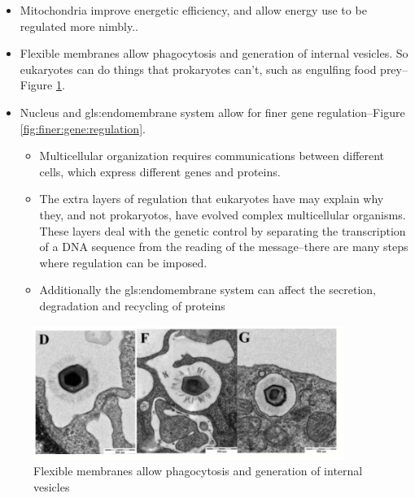 \documentclass[]{article}
\begin{document}
\begin{itemize}
	\item Mitochondria improve energetic efficiency, and allow energy use to be regulated more nimbly.\cite{lane2010energetics}.
	
	\item Flexible membranes allow phagocytosis and generation of internal vesicles. So eukaryotes can do things that prokaryotes can't, such as engulfing food prey--Figure \ref{fig:engulf}.
	
	\item Nucleus and \gls{gls:endomembrane} system allow for finer gene
	regulation--Figure \ref{fig:finer:gene:regulation}\cite{paez2016endocytosis}. 
	\begin{itemize}
		\item Multicellular organization requires communications between different cells, which express different genes and proteins.
		\item The extra layers of regulation that eukaryotes have may explain why they, and not prokaryotos, have evolved complex multicellular organisms. These layers deal with the genetic control by separating the transcription of a DNA sequence from the reading of the message--there are many steps where regulation can be imposed. 
		\item Additionally the \gls{gls:endomembrane} system can affect the secretion, degradation and recycling of proteins
	\end{itemize}
\end{itemize}

\begin{figure}[H]
	\caption{Flexible membranes allow phagocytosis and generation
		of internal vesicles}
	\label{fig:engulf}
	\includegraphics[width=0.9\textwidth]{Engulf}
\end{figure}
\end{document}
